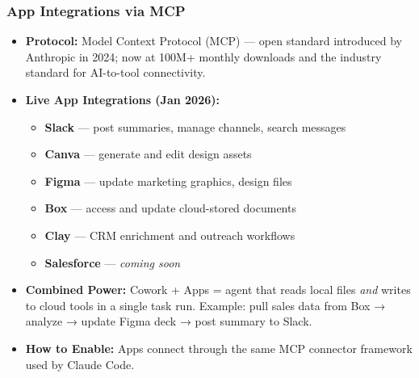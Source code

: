 \begin{frame}[fragile]\frametitle{App Integrations via MCP}
  \begin{itemize}
    \item \textbf{Protocol:} Model Context Protocol (MCP) — open standard introduced by Anthropic in 2024; now at 100M+ monthly downloads and the industry standard for AI-to-tool connectivity.
    \item \textbf{Live App Integrations (Jan 2026):}
      \begin{itemize}
        \item \textbf{Slack} — post summaries, manage channels, search messages
        \item \textbf{Canva} — generate and edit design assets
        \item \textbf{Figma} — update marketing graphics, design files
        \item \textbf{Box} — access and update cloud-stored documents
        \item \textbf{Clay} — CRM enrichment and outreach workflows
        \item \textbf{Salesforce} — \textit{coming soon}
      \end{itemize}
    \item \textbf{Combined Power:} Cowork + Apps = agent that reads local files \textit{and} writes to cloud tools in a single task run. Example: pull sales data from Box → analyze → update Figma deck → post summary to Slack.
    \item \textbf{How to Enable:} Apps connect through the same MCP connector framework used by Claude Code.
  \end{itemize}
\end{frame}

